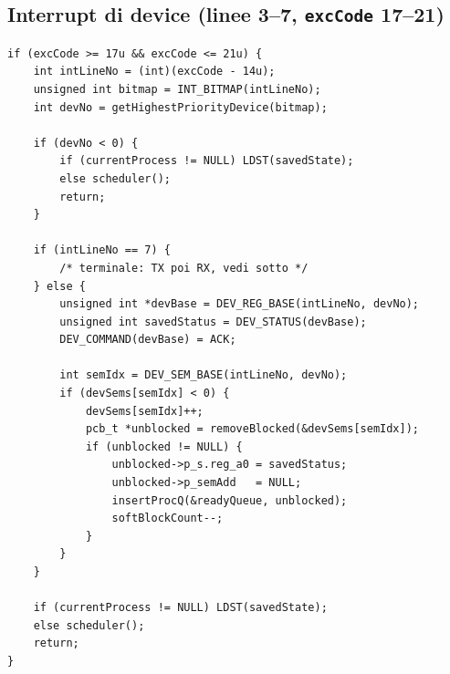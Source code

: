 \documentclass[11pt,a4paper]{article}
\newcommand{\code}[1]{\texttt{#1}}
\begin{document}
\subsection{Interrupt di device (linee 3--7, \code{excCode} 17--21)}
\begin{lstlisting}
if (excCode >= 17u && excCode <= 21u) {
    int intLineNo = (int)(excCode - 14u);
    unsigned int bitmap = INT_BITMAP(intLineNo);
    int devNo = getHighestPriorityDevice(bitmap);

    if (devNo < 0) {
        if (currentProcess != NULL) LDST(savedState);
        else scheduler();
        return;
    }

    if (intLineNo == 7) {
        /* terminale: TX poi RX, vedi sotto */
    } else {
        unsigned int *devBase = DEV_REG_BASE(intLineNo, devNo);
        unsigned int savedStatus = DEV_STATUS(devBase);
        DEV_COMMAND(devBase) = ACK;

        int semIdx = DEV_SEM_BASE(intLineNo, devNo);
        if (devSems[semIdx] < 0) {
            devSems[semIdx]++;
            pcb_t *unblocked = removeBlocked(&devSems[semIdx]);
            if (unblocked != NULL) {
                unblocked->p_s.reg_a0 = savedStatus;
                unblocked->p_semAdd   = NULL;
                insertProcQ(&readyQueue, unblocked);
                softBlockCount--;
            }
        }
    }

    if (currentProcess != NULL) LDST(savedState);
    else scheduler();
    return;
}
\end{lstlisting}
\end{document}
